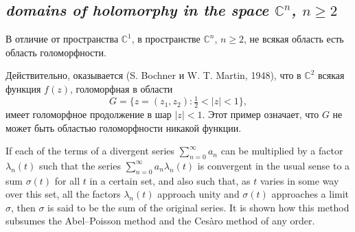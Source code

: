 \subsection*{ \textit{domains of holomorphy in the space $\mathbb C^n$, $n\ge2$}}
\begin{rusblock}
В отличие от пространства $\mathbb C^1$, в пространстве $\mathbb C^n$, $n\ge2$, не всякая область есть область голоморфности.

Действительно, оказывается (S. Bochner и W. T. Martin, 1948), что в $\mathbb C^2$ всякая функция $f(z)$, голоморфная в области
\[
G=\{z=(z_1,z_2):\tfrac12<|z|<1\},
\]
имеет голоморфное продолжение в шар $|z|<1$. Этот пример означает, что $G$ не может быть областью голоморфности никакой функции.
\end{rusblock}


\begin{sourcebox}
If each of the terms of a divergent series $\sum_{n=0}^{\infty}a_n$ can be multiplied by a factor $\lambda_n(t)$ such that the series $\sum_{n=0}^{\infty}a_n\lambda_n(t)$ is convergent in the usual sense to a sum $\sigma(t)$ for all $t$ in a certain set, and also such that, as $t$ varies in some way over this set, all the factors $\lambda_n(t)$ approach unity and $\sigma(t)$ approaches a limit $\sigma$, then $\sigma$ is said to be the sum of the original series. It is shown how this method subsumes the Abel--Poisson method and the Cesàro method of any order.
\end{sourcebox}

